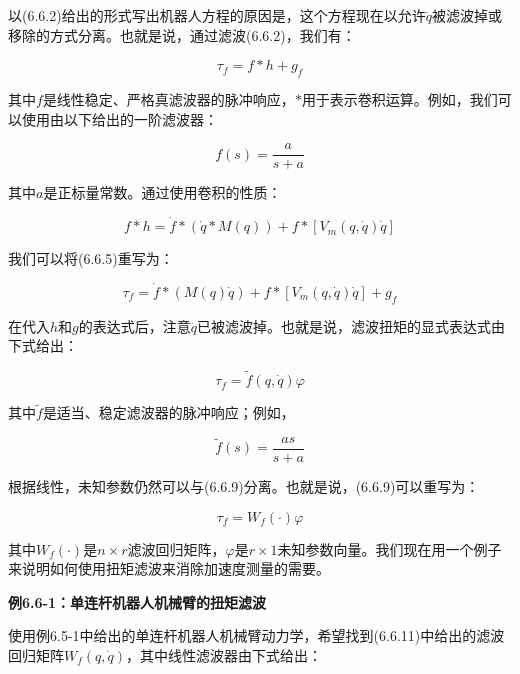 \documentclass[12pt,a4paper]{ctexart}
\begin{document}
以(6.6.2)给出的形式写出机器人方程的原因是，这个方程现在以允许$\ddot{q}$被滤波掉或移除的方式分离。也就是说，通过滤波(6.6.2)，我们有：

\begin{equation}\label{eq:filtered}
\tau_f = f * h + g_f
\end{equation}

其中$f$是线性稳定、严格真滤波器的脉冲响应，$*$用于表示卷积运算。例如，我们可以使用由以下给出的一阶滤波器：

\begin{equation}\label{eq:first-order-filter}
f(s) = \frac{a}{s + a}
\end{equation}

其中$a$是正标量常数。通过使用卷积的性质：

\begin{equation}\label{eq:conv-prop}
f * h = \dot{f} * (\dot{q} * M(q)) + f * [V_m(q, \dot{q})\dot{q}]
\end{equation}

我们可以将(6.6.5)重写为：

\begin{equation}\label{eq:filtered2}
\tau_f = \dot{f} * (M(q)\dot{q}) + f * [V_m(q, \dot{q})\dot{q}] + g_f
\end{equation}

在代入$h$和$g$的表达式后，注意$\ddot{q}$已被滤波掉。也就是说，滤波扭矩的显式表达式由下式给出：

\begin{equation}\label{eq:explicit-filtered}
\tau_f = \tilde{f}(q, \dot{q})\varphi
\end{equation}

其中$\tilde{f}$是适当、稳定滤波器的脉冲响应；例如，

\begin{equation}
\tilde{f}(s) = \frac{as}{s + a}
\end{equation}

根据线性，未知参数仍然可以与(6.6.9)分离。也就是说，(6.6.9)可以重写为：

\begin{equation}\label{eq:filtered-regression}
\tau_f = W_f(\cdot)\varphi
\end{equation}

其中$W_f(\cdot)$是$n \times r$滤波回归矩阵，$\varphi$是$r \times 1$未知参数向量。我们现在用一个例子来说明如何使用扭矩滤波来消除加速度测量的需要。

\textbf{例6.6-1：单连杆机器人机械臂的扭矩滤波}

使用例6.5-1中给出的单连杆机器人机械臂动力学，希望找到(6.6.11)中给出的滤波回归矩阵$W_f(q, \dot{q})$，其中线性滤波器由下式给出：
\end{document}

